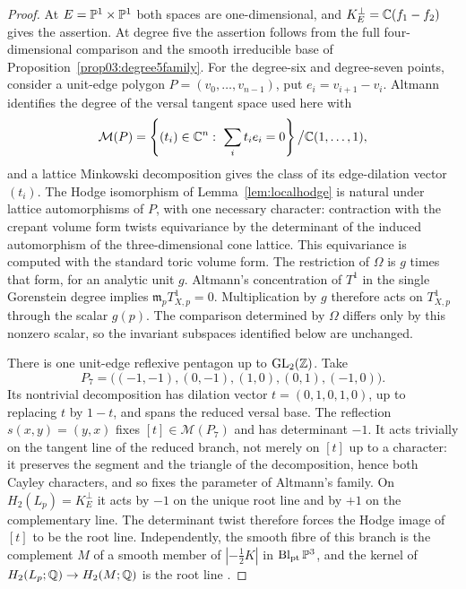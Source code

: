 \begin{proof}
At $E=\mathbb{P}^1\times\mathbb{P}^1$ both spaces are one-dimensional, and
$K_E^\perp=\mathbb{C}(f_1-f_2)$ gives the assertion.  At degree five
the assertion follows from the full four-dimensional
comparison and the smooth irreducible base of
Proposition~\ref{prop03:degree5family}.  For the degree-six and
degree-seven points, consider a unit-edge polygon
$P=(v_0,\ldots,v_{n-1})$, put $e_i=v_{i+1}-v_i$.  Altmann identifies the
degree of the versal tangent space used here with
\begin{equation}\label{eq:altmanntangent}
 \mathcal M(P)=
 \left\{(t_i)\in\mathbb{C}^n:\ \sum_i t_i e_i=0\right\}
 \big/\mathbb{C}(1,\ldots,1),
\end{equation}
and a lattice Minkowski decomposition gives the class of its edge-dilation
vector $(t_i)$.  The Hodge isomorphism of Lemma~\ref{lem:localhodge} is natural
under lattice automorphisms of $P$, with one necessary character: contraction
with the crepant volume form twists equivariance by the determinant of the
induced automorphism of the three-dimensional cone lattice.
This equivariance is computed with the standard toric volume form.
The restriction of $\Omega$ is $g$ times that form, for an analytic
unit $g$.  Altmann's concentration of $T^1$ in the single Gorenstein
degree implies $\mathfrak m_pT^1_{X,p}=0$.  Multiplication by $g$
therefore acts on $T^1_{X,p}$ through the scalar $g(p)$.
The comparison determined by $\Omega$ differs only by this nonzero
scalar, so the invariant subspaces identified below are unchanged.

There is one unit-edge reflexive pentagon up to $\operatorname{GL}_2(\mathbb{Z})$.  Take
\[
 P_7=\bigl((-1,-1),(0,-1),(1,0),(0,1),(-1,0)\bigr).
\]
Its nontrivial decomposition has dilation vector
$t=(0,1,0,1,0)$, up to replacing $t$ by $1-t$, and spans the reduced versal
base.  The reflection $s(x,y)=(y,x)$ fixes $[t]\in\mathcal M(P_7)$ and has
determinant $-1$.  It acts trivially on the tangent line of the reduced
branch, not merely on $[t]$ up to a character: it preserves the segment and the
triangle of the decomposition, hence both Cayley characters, and so fixes the
parameter of Altmann's family.  On
$H_2(L_p)=K_E^\perp$ it acts by $-1$ on the unique root line and by $+1$ on
the complementary line.  The determinant twist therefore forces the Hodge
image of $[t]$ to be the root line.  Independently, the smooth fibre of this
branch is the complement $M$ of a smooth member of $|-\tfrac12K|$ in
$\operatorname{Bl}_{\mathrm{pt}}\mathbb{P}^3$, and the kernel of
$H_2(L_p;\mathbb{Q})\to H_2(M;\mathbb{Q})$ is the root line \cite[Prop.~2.1]{PaperIV}.


\end{proof}
